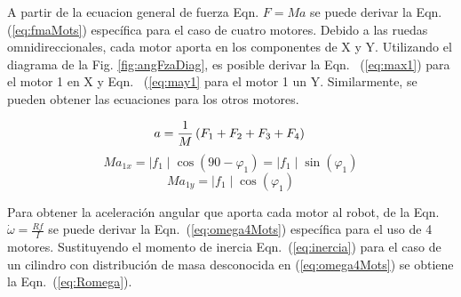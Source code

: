 \documentclass[twocolumn,10pt]{amrob}
\begin{document}
A partir de la ecuacion general de fuerza Eqn. \( F = Ma \) se puede derivar la Eqn. (\ref{eq:fmaMots}) específica para el caso de cuatro motores. Debido a las ruedas omnidireccionales, cada motor aporta en los componentes de X y Y. Utilizando el diagrama de la Fig. \ref{fig:angFzaDiag}, es posible derivar la Eqn. ~(\ref{eq:max1}) para el motor 1 en X y Eqn. ~(\ref{eq:may1} para el motor 1 un Y. Similarmente, se pueden obtener las ecuaciones para los otros motores.\par
\begin{equation}
  a = \frac{1}{M}\left(F_1+F_2+F_3+F_4\right) \label{eq:fmaMots} \\
\end{equation}
\begin{equation}
  Ma_{1x} = \mid f_1 \mid \cos\left(90 - \varphi_1\right) =  \mid f_1 \mid  \sin\left(\varphi_1\right)\label{eq:max1}
\end{equation}
\begin{equation}
  Ma_{1y} = \mid f_1 \mid \cos\left(\varphi_1\right) \label{eq:may1}
\end{equation}

Para obtener la aceleración angular que aporta cada motor al robot, de la Eqn. \(\dot{\omega} = \frac{Rf}{I}\) se puede derivar la Eqn.~(\ref{eq:omega4Mots}) específica para el uso de 4 motores. Sustituyendo el momento de inercia Eqn.~(\ref{eq:inercia}) para el caso de un cilindro con distribución de masa desconocida en (\ref{eq:omega4Mots}) se obtiene la Eqn.~(\ref{eq:Romega}). \par
\end{document}
